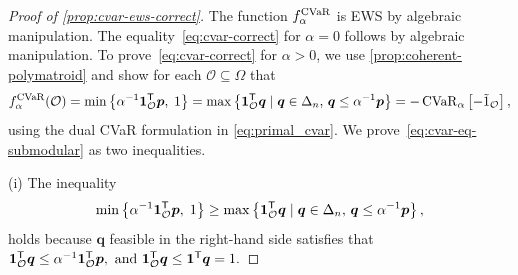 \documentclass[10pt]{article} %
\begin{document}
\begin{proof}[Proof of \cref{prop:cvar-ews-correct}]
The function $f_{\alpha }^{\operatorname{CVaR}}$ is EWS by algebraic manipulation. The equality~\eqref{eq:cvar-correct} for $\alpha = 0$ follows by algebraic manipulation. To prove~\eqref{eq:cvar-correct} for $\alpha > 0$, we use \cref{prop:coherent-polymatroid} and show for each $\mathcal{O} \subseteq \Omega$ that
\begin{equation}
\label{eq:cvar-eq-submodular}
  f_{\alpha}^{\operatorname{CVaR}}(\mathcal{O})
  =
  \min\left\{ \alpha^{-1} \bm{1}_{\mathcal{O}}^{\mathsf{T}} \bm{p},\; 1 \right\}
= \max \left\{ \bm{1}_{\mathcal{O}}^{\mathsf{T}} \bm{q} \mid 
\bm{q} \in \Delta_{n}, \,
\bm{q} \le \alpha^{-1} \bm{p}
\right\}
=
  -\operatorname{CVaR}_{\alpha } \left[- \tilde{1}_{\mathcal{O}}\right] ,
\end{equation}
using the dual CVaR formulation in \eqref{eq:primal_cvar}. We prove~\eqref{eq:cvar-eq-submodular} as two inequalities.

(i) The inequality 
\[
\min\left\{ \alpha^{-1} \bm{1}_{\mathcal{O}}^{\mathsf{T}} \bm{p},\; 1 \right\}
\ge \max \left\{ \bm{1}_{\mathcal{O}}^{\mathsf{T}} \bm{q} \mid \bm{q} \in \Delta_{n}, \, \bm{q} \le \alpha^{-1} \bm{p}
\right\},
\]
holds because $\bm{q}$ feasible in the right-hand side satisfies that 
\(  \bm{1}_{\mathcal{O}}^{\mathsf{T}} \bm{q} \le \alpha^{-1} \bm{1}_{\mathcal{O}}^{\mathsf{T}} \bm{p},
 \text{ and }
  \bm{1}_{\mathcal{O}}^{\mathsf{T}} \bm{q} \le \bm{1}^{\mathsf{T}} \bm{q} = 1.
\)


\end{proof}
\end{document}
